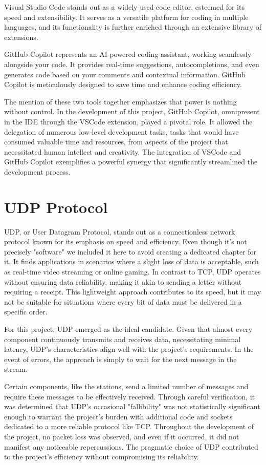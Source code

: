 \documentclass{Configuration_Files/PoliMi3i_thesis}
\begin{document}
Visual Studio Code stands out as a widely-used code editor, esteemed for its speed and extensibility. It serves as a versatile platform for coding in multiple languages, and its functionality is further enriched through an extensive library of extensions.

GitHub Copilot represents an AI-powered coding assistant, working seamlessly alongside your code. It provides real-time suggestions, autocompletions, and even generates code based on your comments and contextual information. GitHub Copilot is meticulously designed to save time and enhance coding efficiency.

The mention of these two tools together emphasizes that power is nothing without control. In the development of this project, GitHub Copilot, omnipresent in the IDE through the VSCode extension, played a pivotal role. It allowed the delegation of numerous low-level development tasks, tasks that would have consumed valuable time and resources, from aspects of the project that necessitated human intellect and creativity. The integration of VSCode and GitHub Copilot exemplifies a powerful synergy that significantly streamlined the development process.

 

\section{UDP Protocol}

UDP, or User Datagram Protocol, stands out as a connectionless network protocol known for its emphasis on speed and efficiency. Even though it's not precisely "software" we included it here to avoid creating a dedicated chapter for it. It finds applications in scenarios where a slight loss of data is acceptable, such as real-time video streaming or online gaming. In contrast to TCP, UDP operates without ensuring data reliability, making it akin to sending a letter without requiring a receipt. This lightweight approach contributes to its speed, but it may not be suitable for situations where every bit of data must be delivered in a specific order.

For this project, UDP emerged as the ideal candidate. Given that almost every component continuously transmits and receives data, necessitating minimal latency, UDP's characteristics align well with the project's requirements. In the event of errors, the approach is simply to wait for the next message in the stream.

Certain components, like the stations, send a limited number of messages and require these messages to be effectively received. Through careful verification, it was determined that UDP's occasional "fallibility" was not statistically significant enough to warrant the project's burden with additional code and sockets dedicated to a more reliable protocol like TCP. Throughout the development of the project, no packet loss was observed, and even if it occurred, it did not manifest any noticeable repercussions. The pragmatic choice of UDP contributed to the project's efficiency without compromising its reliability.
\end{document}
